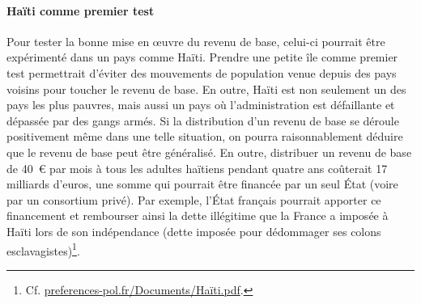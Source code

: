 \documentclass[a5paper,french,openany]{memoir}
\begin{document}
\paragraph{Haïti comme premier test}
Pour tester la bonne mise en œuvre du revenu de base, celui-ci pourrait être expérimenté dans un pays comme Haïti. Prendre une petite île comme premier test permettrait d'éviter des mouvements de population venue depuis des pays voisins pour toucher le revenu de base. En outre, Haïti est non seulement un des pays les plus pauvres, mais aussi un pays où l'administration est défaillante et dépassée par des gangs armés. Si la distribution d'un revenu de base se déroule positivement même dans une telle situation, on pourra raisonnablement déduire que le revenu de base peut être généralisé. En outre, distribuer un revenu de base de 40~\euro{} par mois à tous les adultes haïtiens pendant quatre ans coûterait 17 milliards d'euros, une somme qui pourrait être financée par un seul État (voire par un consortium privé). %
Par exemple, l'État français pourrait apporter ce financement et rembourser ainsi la dette illégitime que la France a imposée à Haïti lors de son indépendance (dette imposée pour dédommager ses colons esclavagistes)\footnote{Cf. \href{http://preferences-pol.fr/Documents/Haïti.pdf}{preferences-pol.fr/Documents/Haïti.pdf}.}.



\end{document}
